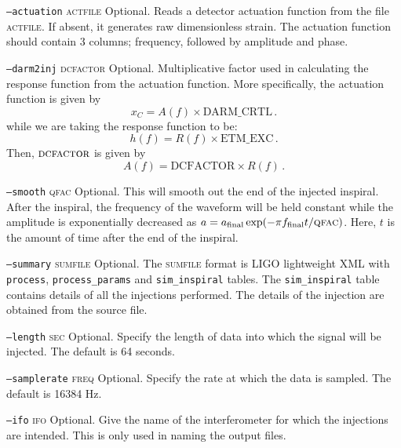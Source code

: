 \begin{entry}
\begin{entry}
\item[\texttt{--actuation} \textsc{actfile}] Optional. Reads a detector
 actuation function from the file \textsc{actfile}.  If absent, it generates 
raw dimensionless strain.  The actuation function should contain 3 columns; frequency, followed by amplitude and phase. 


\item[\texttt{--darm2inj} \textsc{dcfactor}] Optional.  Multiplicative
factor used in calculating the response function from the actuation
function.  More specifically, the actuation function is given by 
%
\begin{equation}
   x_{C} = A(f) \times \mathrm{DARM}\_\mathrm{CRTL} \, .
\end{equation}
%
while we are taking the response function to be:
%
\begin{equation}
   h(f) = R(f) \times \mathrm{ETM}\_\mathrm{EXC} \, .
\end{equation}
%
Then, $\textsc{dcfactor}$ is given by
%
\begin{equation}
   A(f) = \mathrm{DCFACTOR} \times R(f) \, .
\end{equation}

\item[\texttt{--smooth} \textsc{qfac}]  Optional.  This will smooth out
the end of the injected inspiral.  After the inspiral, the frequency of
the waveform will be held constant while the amplitude is exponentially
decreased as $a = a_{\mathrm{final}} \exp(- \pi f_{\mathrm{final}} t /
\textsc{qfac})$.  Here, $t$ is the amount of time after the end of the
inspiral.

\item[\texttt{--summary} \textsc{sumfile}] Optional. The \textsc{sumfile} format
is LIGO lightweight XML with \texttt{process}, \texttt{process\_params} and
\texttt{sim\_inspiral} tables.  The \texttt{sim\_inspiral} table contains
details of all the injections performed.  The details of the injection are
obtained from the source file.

\item[\texttt{--length} \textsc{sec}] Optional.  Specify the length of data into
which the signal will be injected.  The default is 64 seconds.

\item[\texttt{--samplerate} \textsc{freq}] Optional.  Specify the rate at which
the data is sampled.  The default is 16384 Hz.

\item[\texttt{--ifo} \textsc{ifo}] Optional.  Give the name of the
interferometer for which the injections are intended.  This is only used in
naming the output files.


\end{entry}
\end{entry}
